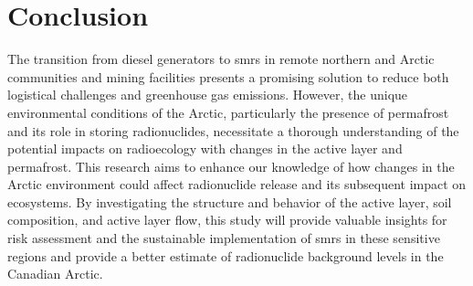 \chapter{Conclusion}
The transition from diesel generators to \glspl{smr} in remote northern and Arctic communities and mining facilities presents a promising solution to reduce both logistical challenges and greenhouse gas emissions. 
However, the unique environmental conditions of the Arctic, particularly the presence of permafrost and its role in storing radionuclides, necessitate a thorough understanding of the potential impacts on radioecology with changes in the active layer and permafrost. 
This research aims to enhance our knowledge of how changes in the Arctic environment could affect radionuclide release and its subsequent impact on ecosystems. 
By investigating the structure and behavior of the active layer, soil composition, and active layer flow, this study will provide valuable insights for risk assessment and the sustainable implementation of \glspl{smr} in these sensitive regions and provide a better estimate of radionuclide background levels in the Canadian Arctic.
